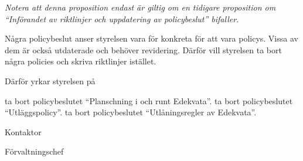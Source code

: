 \documentclass[../_main/handlingar.tex]{subfiles}
\begin{document}

\emph{Notera att denna proposition endast är giltig om en tidigare proposition om ``Införandet av riktlinjer och uppdatering av policybeslut'' bifaller.}

Några policybeslut anser styrelsen vara för konkreta för att vara policys. Vissa av dem är också utdaterade och behöver revidering. Därför vill styrelsen ta bort några policies och skriva riktlinjer istället.

Därför yrkar styrelsen på
\begin{attsatser}
    \att ta bort policybeslutet ``Planschning i och runt Edekvata''.
    \att ta bort policybeslutet ``Utläggspolicy''.
    \att ta bort policybeslutet ``Utlåningsregler av Edekvata''.
\end{attsatser}

\begin{signatures}{2}
    \ist
    \signature{Erik Månsson}{Kontaktor}
    \signature{Anders Nilsson}{Förvaltningschef}
\end{signatures}
\end{document}
